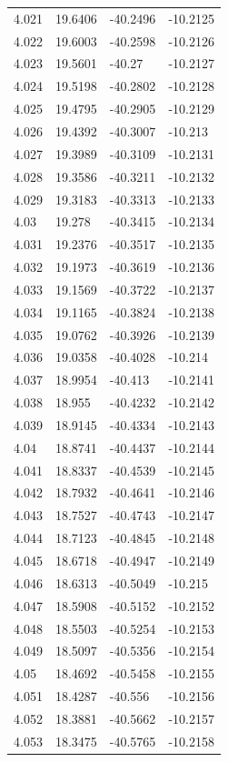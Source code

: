 \begin{tabular}{llll}
4.021 & 19.6406 & -40.2496 & -10.2125 \\
4.022 & 19.6003 & -40.2598 & -10.2126 \\
4.023 & 19.5601 & -40.27 & -10.2127 \\
4.024 & 19.5198 & -40.2802 & -10.2128 \\
4.025 & 19.4795 & -40.2905 & -10.2129 \\
4.026 & 19.4392 & -40.3007 & -10.213 \\
4.027 & 19.3989 & -40.3109 & -10.2131 \\
4.028 & 19.3586 & -40.3211 & -10.2132 \\
4.029 & 19.3183 & -40.3313 & -10.2133 \\
4.03 & 19.278 & -40.3415 & -10.2134 \\
4.031 & 19.2376 & -40.3517 & -10.2135 \\
4.032 & 19.1973 & -40.3619 & -10.2136 \\
4.033 & 19.1569 & -40.3722 & -10.2137 \\
4.034 & 19.1165 & -40.3824 & -10.2138 \\
4.035 & 19.0762 & -40.3926 & -10.2139 \\
4.036 & 19.0358 & -40.4028 & -10.214 \\
4.037 & 18.9954 & -40.413 & -10.2141 \\
4.038 & 18.955 & -40.4232 & -10.2142 \\
4.039 & 18.9145 & -40.4334 & -10.2143 \\
4.04 & 18.8741 & -40.4437 & -10.2144 \\
4.041 & 18.8337 & -40.4539 & -10.2145 \\
4.042 & 18.7932 & -40.4641 & -10.2146 \\
4.043 & 18.7527 & -40.4743 & -10.2147 \\
4.044 & 18.7123 & -40.4845 & -10.2148 \\
4.045 & 18.6718 & -40.4947 & -10.2149 \\
4.046 & 18.6313 & -40.5049 & -10.215 \\
4.047 & 18.5908 & -40.5152 & -10.2152 \\
4.048 & 18.5503 & -40.5254 & -10.2153 \\
4.049 & 18.5097 & -40.5356 & -10.2154 \\
4.05 & 18.4692 & -40.5458 & -10.2155 \\
4.051 & 18.4287 & -40.556 & -10.2156 \\
4.052 & 18.3881 & -40.5662 & -10.2157 \\
4.053 & 18.3475 & -40.5765 & -10.2158 \\

\end{tabular}

